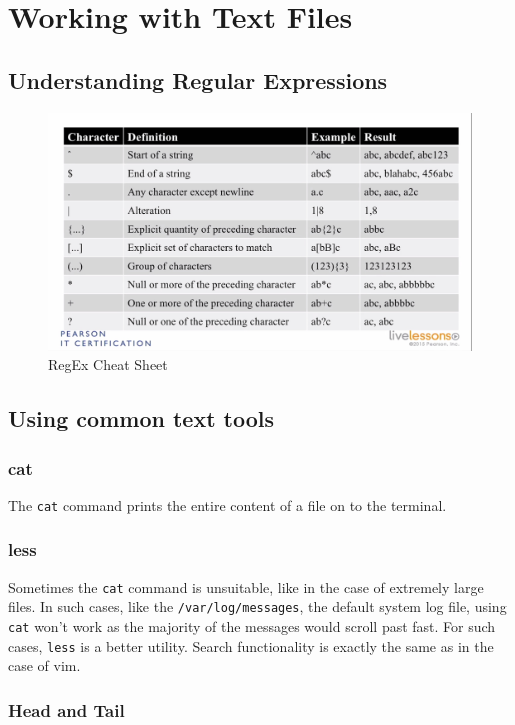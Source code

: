 \chapter{Working with Text Files}
\section{Understanding Regular Expressions}
\begin{figure}[h]
	\centering
	\includegraphics[width=0.9\linewidth]{"RHCSA/Mod1/chapters/1.4.a RegEx Cheat Sheet"}
	\caption{RegEx Cheat Sheet}
	\label{fig:regex-cheat-sheet}
\end{figure}


\section{Using common text tools}
\subsection{cat}
The \verb|cat| command prints the entire content of a file on to the terminal. 

\subsection{less}
Sometimes the \verb|cat| command is unsuitable, like in the case of extremely large files. In such cases, like the \verb|/var/log/messages|, the default system log file, using \verb|cat| won't work as the majority of the messages would scroll past fast. For such cases, \verb|less| is a better utility. Search functionality is exactly the same as in the case of vim. 

\subsection{Head and Tail}
